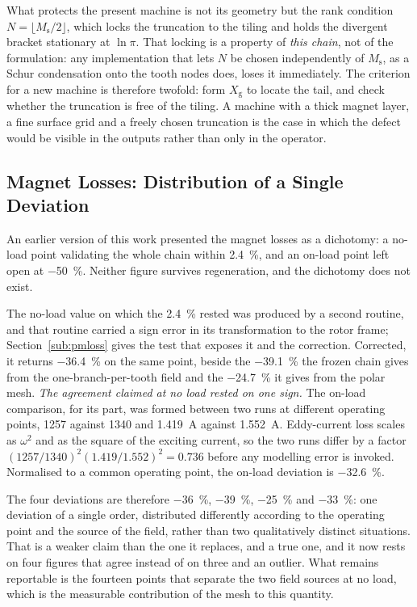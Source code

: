 \documentclass[10pt,a4paper,twocolumn]{article}
\newcommand{\Xg}{X_{\mathrm{g}}}
\theoremstyle{plain}
\theoremstyle{remark}
\begin{document}
What protects the present machine is not its geometry but the rank
condition $N=\lfloor M_{\mathrm{s}}/2\rfloor$, which locks the
truncation to the tiling and holds the divergent bracket stationary
at $\ln\pi$. That locking is a property of \emph{this chain}, not of the
formulation: any implementation that lets $N$ be chosen independently of
$M_{\mathrm{s}}$, as a Schur condensation onto the tooth nodes
does, loses it immediately. The criterion for a new machine is therefore twofold: form
$\Xg$ to locate the tail, and check whether the truncation is free of
the tiling. A machine with a thick magnet layer, a fine surface grid and
a freely chosen truncation is the case in which the defect would be
visible in the outputs rather than only in the operator.

\subsection{Magnet Losses: Distribution of a Single Deviation}
\label{sub:pmloss_bound}

An earlier version of this work presented the magnet losses as a
dichotomy: a no-load point validating the whole chain within
\SI{2.4}{\percent}, and an on-load point left open at
\SI{-50}{\percent}. Neither figure survives regeneration, and the
dichotomy does not exist.

The no-load value on which the \SI{2.4}{\percent} rested was produced by
a second routine, and that routine carried a sign error in its
transformation to the rotor frame; Section~\ref{sub:pmloss} gives the
test that exposes it and the correction. Corrected, it returns
\SI{-36.4}{\percent} on the same point, beside the \SI{-39.1}{\percent}
the frozen chain gives from the one-branch-per-tooth field and the
\SI{-24.7}{\percent} it gives from the polar mesh. \emph{The agreement
claimed at no load rested on one sign.}
The on-load comparison, for its part, was formed between two runs at
different operating points, \SI{1257}{\rpm} against
\SI{1340}{\rpm} and \SI{1.419}{\ampere} against
\SI{1.552}{\ampere}. Eddy-current loss scales as $\omega^2$ and as the
square of the exciting current, so the two runs differ by a factor
$(1257/1340)^2(1.419/1.552)^2=\num{0.736}$ before any modelling error is
invoked. Normalised to a common operating point, the on-load deviation
is \SI{-32.6}{\percent}.

The four deviations are therefore \SI{-36}{\percent},
\SI{-39}{\percent}, \SI{-25}{\percent} and \SI{-33}{\percent}: one
deviation of a single order, distributed differently according to the
operating point and the source of the field, rather than two
qualitatively distinct situations. That is a weaker claim than the one
it replaces, and a true one, and it now rests on four figures that
agree instead of on three and an outlier. What remains reportable is
the fourteen points that separate the two field sources at no load,
which is the measurable contribution of the mesh to this quantity.
\end{document}
